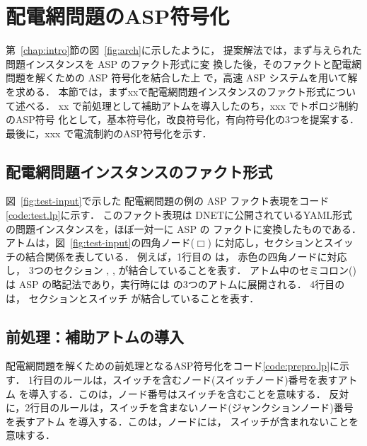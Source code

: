 ﻿\section{配電網問題のASP符号化}\label{chap:encode}

第~\ref{chap:intro}節の図~\ref{fig:arch}に示したように，
提案解法では，まず与えられた問題インスタンスを ASP のファクト形式に変
換した後，そのファクトと配電網問題を解くための ASP 符号化を結合した上
で，高速 ASP システム{\clingo}を用いて解を求める．
%
本節では，まずxxで配電網問題インスタンスのファクト形式について述べる．
xx で前処理として補助アトムを導入したのち，xxx でトポロジ制約のASP符号
化として，基本符号化，改良符号化，有向符号化の3つを提案する．
最後に，xxx で電流制約のASP符号化を示す．

\subsection{配電網問題インスタンスのファクト形式}



図~\ref{fig:test-input}で示した
配電網問題の例の ASP ファクト表現をコード\ref{code:test.lp}に示す．
このファクト表現は
DNETに公開されているYAML形式の問題インスタンスを，ほぼ一対一に ASP の
ファクトに変換したものである．
%
アトムは，図~\ref{fig:test-input}の四角ノード($\Box$)
に対応し，セクションとスイッチの結合関係を表している．
例えば，1行目の
は，
赤色の四角ノードに対応し，
3つのセクション
, , 
が結合していることを表す．
アトム中のセミコロン(\code{;})は ASP の略記法であり，実行時には
の3つのアトムに展開される．
%
4行目のは，
セクションとスイッチ
が結合していることを表す．

\subsection{前処理：補助アトムの導入}
配電網問題を解くための前処理となるASP符号化をコード\ref{code:prepro.lp}に示す．
1行目のルールは，スイッチを含むノード(スイッチノード)番号を表すアトム
を導入する．このは，ノード番号はスイッチを含むことを意味する．
反対に，2行目のルールは，スイッチを含まないノード(ジャンクションノード)番号を表すアトム
を導入する．このは，ノードには，
スイッチが含まれないことを意味する．

